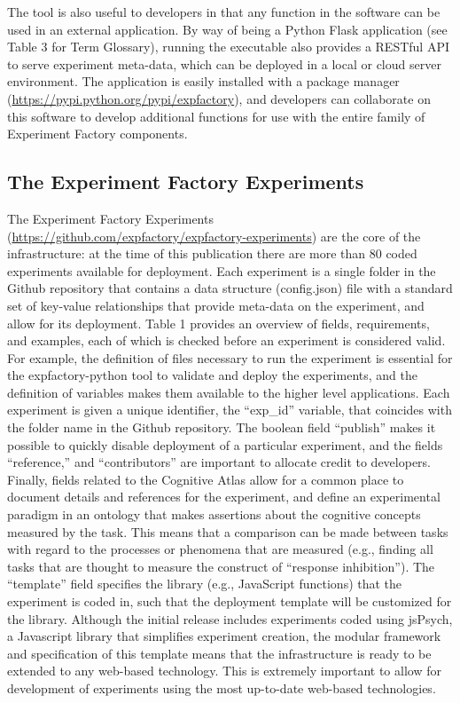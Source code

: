 \documentclass{report}
\begin{document}
The tool is also useful to developers in that any function in the
software can be used in an external application. By way of being a
Python Flask application (see Table 3 for Term Glossary), running the
executable also provides a RESTful API to serve experiment meta-data,
which can be deployed in a local or cloud server environment. The
application is easily installed with a package manager (\href{https://pypi.python.org/pypi/expfactory}{https://pypi.python.org/pypi/expfactory}), and developers can
collaborate on this software to develop additional functions for use
with the entire family of Experiment Factory components.

\subsection{The Experiment Factory Experiments}

The Experiment Factory Experiments
(\href{https://github.com/expfactory/expfactory-experiments}{https://github.com/expfactory/expfactory-experiments}) are the core of
the infrastructure: at the time of this publication there are more than
80 coded experiments available for deployment. Each experiment is a
single folder in the Github repository that contains a data structure
(config.json) file with a standard set of key-value relationships that
provide meta-data on the experiment, and allow for its deployment. Table
1 provides an overview of fields, requirements, and examples, each of
which is checked before an experiment is considered valid. For example,
the definition of files necessary to run the experiment is essential for
the expfactory-python tool to validate and deploy the experiments, and
the definition of variables makes them available to the higher level
applications. Each experiment is given a unique identifier, the
``exp\_id'' variable, that coincides with the folder name in the Github
repository. The boolean field ``publish'' makes it possible to quickly
disable deployment of a particular experiment, and the fields
``reference,'' and ``contributors'' are important to allocate credit to
developers. Finally, fields related to the Cognitive Atlas \cite{Poldrack2011-jp} allow
for a common place to document details and references for the
experiment, and define an experimental paradigm in an ontology that
makes assertions about the cognitive concepts measured by the task. This
means that a comparison can be made between tasks with regard to the
processes or phenomena that are measured (e.g., finding all tasks that
are thought to measure the construct of ``response inhibition''). The
``template'' field specifies the library (e.g., JavaScript functions)
that the experiment is coded in, such that the deployment template will
be customized for the library. Although the initial release includes
experiments coded using jsPsych, a Javascript library that simplifies
experiment creation, the modular framework and specification of this
template means that the infrastructure is ready to be extended to any
web-based technology. This is extremely important to allow for
development of experiments using the most up-to-date web-based
technologies.
\end{document}
